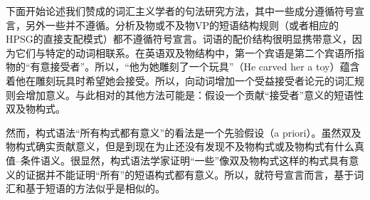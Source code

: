     下面开始论述我们赞成的词汇主义学者的句法研究方法，其中一些成分遵循符号宣言，另外一些并不遵循。分析及物或不及物VP的短语结构规则（或者相应的HPSG的直接支配模式）都不遵循符号宣言。词语的配价结构很明显携带意义，因为它们与特定的动词相联系。在英语双及物结构中，第一个宾语是第二个宾语所指物的“有意接受者”。所以，“他为她雕刻了一个玩具”（He carved her a toy）蕴含着他在雕刻玩具时希望她会接受。所以，向动词增加一个受益接受者论元的词汇规则会增加意义。与此相对的其他方法可能是：假设一个贡献“接受者”意义的短语性双及物构式。

然而，构式语法“所有构式都有意义”的看法是一个先验假设（a priori）。虽然双及物构式确实贡献意义，但是到现在为止还没有发现不及物构式或及物构式有什么真值--条件语义。很显然，构式语法学家证明“一些”像双及物构式这样的构式具有意义的证据并不能证明“所有”的短语构式都有意义。所以，就符号宣言而言，基于词汇和基于短语的方法似乎是相似的。

